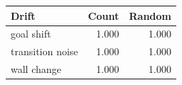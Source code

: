 \begin{tabular}{lrr}
\toprule
Drift & Count & Random \\
\midrule
goal shift & 1.000 & 1.000 \\
transition noise & 1.000 & 1.000 \\
wall change & 1.000 & 1.000 \\
\bottomrule
\end{tabular}

